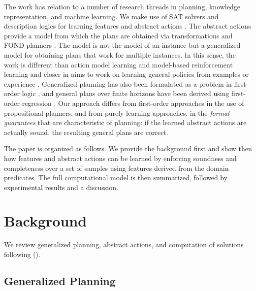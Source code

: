 \documentclass[letterpaper]{article} %
\newcommand{\citeay}[1]{\citeauthor{#1} (\citeyear{#1})}
\begin{document}
The work has relation to a number of research threads in planning, knowledge
representation, and machine learning. We make use of SAT solvers and description
logics for learning features and abstract actions \cite{sat-handbook,dl-handbook}.
The abstract actions provide a model from which the plans are obtained via
transformations and FOND planners \cite{geffner:book,ghallab:book}.
The model is not the model of an instance but a generalized model for obtaining
plans that work for multiple instances. In this sense, the work is different than
action model learning \cite{yang:action-learning} and model-based reinforcement
learning and closer in aims to work on learning general policies from examples or
experience \cite{martin-geffner:generalized,fern:bias,mazebase,general-drl}.
Generalized planning has also been formulated as a problem in first-order logic
\cite{srivastava:generalized}, and general plans over finite horizons have been
derived using first-order regression \cite{boutilier2001symbolic,wang2008first,van2012solving}.
Our approach differs from first-order approaches in the use of propositional
planners, and from purely learning approaches, in the \emph{formal guarantees} that
are characteristic of planning: if the learned abstract actions are actually sound,
the resulting general plans are correct. 

The paper is organized as follows. We provide the background  first and show then
how features and abstract actions can be learned by enforcing soundness and
completeness over a set of samples  using features derived from the domain predicates.
The full computational model is then summarized, followed by experimental results
and a discussion.


\section{Background}

We review generalized planning, abstract actions, and computation of solutions 
following  \citeay{bonet:ijcai2018}.


\subsection{Generalized Planning}
\end{document}
